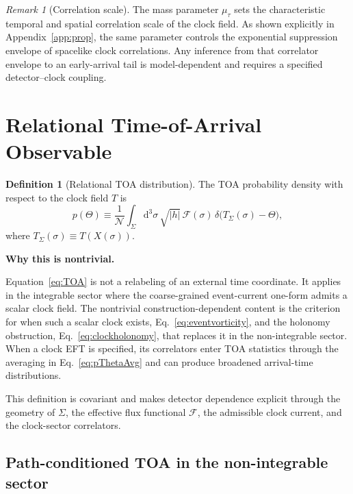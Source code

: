 \documentclass[11pt, a4paper]{article}
\theoremstyle{definition}
\newtheorem{definition}{Definition}[section]
\theoremstyle{plain}
\theoremstyle{remark}
\newtheorem{remark}{Remark}[section]
\numberwithin{equation}{section}
\newcommand{\dd}{\mathrm{d}}
\newcommand{\Sig}{\Sigma}
\newcommand{\F}{\mathcal{F}}
\begin{document}
    \begin{remark}[Correlation scale]
The mass parameter $\mu_\tau$ sets the characteristic temporal and spatial correlation scale of the clock field. As shown explicitly in Appendix~\ref{app:prop}, the same parameter controls the exponential suppression envelope of spacelike clock correlations. Any inference from that correlator envelope to an early-arrival tail is model-dependent and requires a specified detector--clock coupling.
    \end{remark}

    \section{Relational Time-of-Arrival Observable}\label{sec:toaobservable}
    
    \begin{definition}[Relational TOA distribution]
The TOA probability density with respect to the clock field $T$ is
\begin{equation}
    p(\Theta) \equiv
    \frac{1}{\mathcal{N}}
    \int_\Sig \dd^3\sigma\,\sqrt{|h|}\,
    \F(\sigma)\,
    \delta\!\big(T_\Sig(\sigma)-\Theta\big),
    \label{eq:TOA}
\end{equation}
where $T_\Sig(\sigma)\equiv T(X(\sigma))$.
    \end{definition}
    
    \medskip\noindent\textbf{Why this is nontrivial.}\par
        Equation~\eqref{eq:TOA} is not a relabeling of an external time coordinate. It applies in the integrable sector where the coarse-grained event-current one-form admits a scalar clock field. The nontrivial construction-dependent content is the criterion for when such a scalar clock exists, Eq.~\eqref{eq:eventvorticity}, and the holonomy obstruction, Eq.~\eqref{eq:clockholonomy}, that replaces it in the non-integrable sector. When a clock EFT is specified, its correlators enter TOA statistics through the averaging in Eq.~\eqref{eq:pThetaAvg} and can produce broadened arrival-time distributions.
        
        This definition is covariant and makes detector dependence explicit through the geometry of $\Sig$, the effective flux functional $\F$, the admissible clock current, and the clock-sector correlators.

    \subsection{Path-conditioned TOA in the non-integrable sector}
\end{document}
